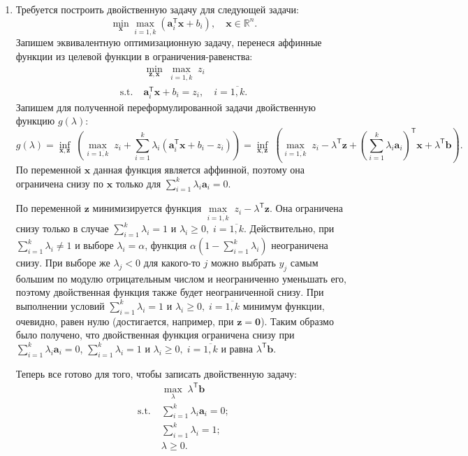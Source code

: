 \documentclass[a4paper,12pt]{article}
\renewcommand{\geq}{\geqslant}
\renewcommand{\top}{\mathsf{T}}
\begin{document}
\begin{enumerate}
\item
Требуется построить двойственную задачу для следующей задачи:
\begin{equation*}
	\min\limits_\mathbf{x} \max\limits_{i=\overline{1,k}} (\mathbf{a}_i^\top \mathbf{x} + b_i),\quad \mathbf{x}\in\mathbb{R}^n.
\end{equation*}
Запишем эквивалентную оптимизационную задачу, перенеся аффинные функции из целевой функции в ограничения-равенства:
	\begin{equation*}
	\begin{aligned}
		& \min_{\mathbf{z},\mathbf{x}}\;\max\limits_{i=\overline{1,k}} \;z_i  \\
		\text{s.t.}\; & \mathbf{a}_i^\top \mathbf{x} + b_i = z_i,\quad i=\overline{1,k}.
	\end{aligned}
\end{equation*}
Запишем для полученной переформулированной задачи двойственную функцию $g(\lambda)$:
$$
g(\lambda) = \inf\limits_{\mathbf{x},\mathbf{z}}\;\left( \max\limits_{i=\overline{1,k}} \;z_i + \sum\limits_{i=1}^{k} \lambda_i (\mathbf{a}_i^\top \mathbf{x} + b_i - z_i)
\right) = \inf\limits_{\mathbf{x},\mathbf{z}}\;\left( \max\limits_{i=\overline{1,k}} \;z_i - \lambda^\top \mathbf{z} + \left(\sum\limits_{i=1}^{k} \lambda_i \mathbf{a}_i\right)^\top\mathbf{x} + \lambda^\top \mathbf{b}
\right).
$$
По переменной $\mathbf{x}$ данная функция является аффинной, поэтому она ограничена снизу по $\mathbf{x}$ только для $\sum\limits_{i=1}^{k} \lambda_i \mathbf{a}_i=0$.

По переменной $\mathbf{z}$ минимизируется функция $\max\limits_{i=\overline{1,k}} \;z_i - \lambda^\top \mathbf{z}$. Она ограничена снизу только в случае $\sum_{i=1}^k\lambda_i=1$ и $\lambda_i\geq 0,\;i=\overline{1,k}$. Действительно, при  $\sum_{i=1}^k\lambda_i\neq1$ и выборе $\lambda_i=\alpha$, функция $\alpha(1-\sum_{i=1}^k\lambda_i)$ неограничена снизу. При выборе же $\lambda_j < 0$ для какого-то $j$ можно выбрать $y_j$ самым большим по модулю отрицательным числом и неограниченно уменьшать его, поэтому двойственная функция также будет неограниченной снизу. При выполнении условий $\sum_{i=1}^k\lambda_i=1$ и $\lambda_i\geq 0,\;i=\overline{1,k}$ минимум функции, очевидно, равен нулю (достигается, например, при $\mathbf{z}=\mathbf{0}$). Таким образмо было получено, что двойственная функция ограничена снизу при  $\sum\limits_{i=1}^{k} \lambda_i \mathbf{a}_i=0$, $\sum_{i=1}^k\lambda_i=1$ и $\lambda_i\geq 0,\;i=\overline{1,k}$ и равна $\lambda^\top \mathbf{b}$.

Теперь все готово для того, чтобы записать двойственную задачу:
\begin{equation*}
	\begin{aligned}
		& \max_\lambda\; \lambda^\top \mathbf{b}\\
		\text{s.t.}\; & \sum\limits_{i=1}^{k} \lambda_i \mathbf{a}_i = 0; \\
		 & \sum_{i=1}^k\lambda_i=1; \\
		 & \lambda \geq 0. \\
	\end{aligned}
\end{equation*}


\end{enumerate}
\end{document}
